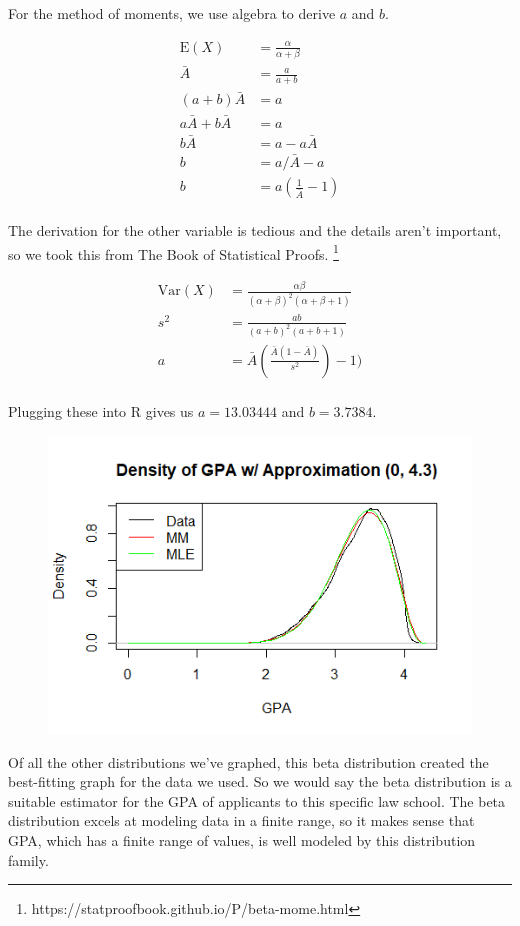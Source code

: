 \documentclass[12pt, a4paper, oneside]{report}
\begin{document}
For the method of moments, we use algebra to derive $a$ and $b$.

\begin{align*}
  \mathrm{E}(X) &= \frac{\alpha}{\alpha+\beta} \\
  \bar{A} &= \frac{a}{a+b} \\
  (a + b)\bar{A} &= a \\
  a\bar{A} + b\bar{A} &= a \\
  b\bar{A} &= a - a\bar{A} \\
  b &= a / \bar{A} - a \\
  b &= a \left( \frac{1}{\bar{A}} - 1 \right) \\
\end{align*}

The derivation for the other variable is tedious and the details aren't important, so we took this from The Book of Statistical Proofs.
\footnote{https://statproofbook.github.io/P/beta-mome.html}

\begin{align*}
  \mathrm{Var}(X) &= \frac{\alpha\beta}{(\alpha+\beta)^2 (\alpha+\beta+1)} \\
  s^2 &= \frac{ab}{(a+b)^2 (a+b+1)} \\
  a &= \bar{A}(\frac{\bar{A}(1-\bar{A})}{s^2})-1) \\
\end{align*}

Plugging these into R gives us $a = 13.03444$ and $b = 3.7384$.

\begin{figure}[h]
  \centering
  \includegraphics[width=\linewidth]{betaDensityA43.png}
\end{figure}
\newpage

Of all the other distributions we’ve graphed, this beta distribution created the best-fitting graph for the data we used. So we would say the beta distribution is a suitable estimator for the GPA of applicants to this specific law school. The beta distribution excels at modeling data in a finite range, so it makes sense that GPA, which has a finite range of values, is well modeled by this distribution family. 
\end{document}
